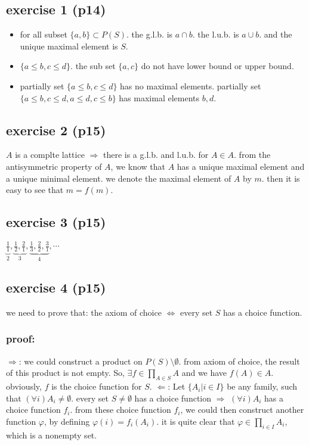 \documentclass[11pt]{article}
\begin{document}
\subsection{exercise 1 (p14)}
\label{sec:orgeb4f90c}
\begin{itemize}
\item for all subset \(\{a, b\}\subset P(S)\). the g.l.b. is \(a\cap b\).
the l.u.b. is \(a\cup b\). and the unique maximal element is \(S\).
\item \(\{a\leq b, c\leq d\}\). 
the sub set \(\{a, c\}\) do not have lower bound or upper bound.
\item partially set \(\{a\leq b, c\leq d\}\) has no maximal elements.
partially set \(\{a\leq b, c\leq d, a\leq d, c\leq b\}\) has maximal elements \(b, d\).
\end{itemize}
\subsection{exercise 2 (p15)}
\label{sec:org5f3d288}
\(A\) is a complte lattice \(\Rightarrow\) there is a g.l.b. and l.u.b. for \(A\in A\).
from the antisymmetric property of \(A\), we know that \(A\) has 
a unique maximal element and a unique minimal element.
we denote the maximal element of \(A\) by \(m\).
then it is easy to see that \(m = f(m)\).
\subsection{exercise 3 (p15)}
\label{sec:org4d8c99f}
\(\underbrace{\frac{1}{1}}_{2}, \underbrace{\frac{1}{2}, \frac{2}{1}}_{3}, \underbrace{\frac{1}{3}, \frac{2}{2}, \frac{3}{1}}_{4}, \cdots\)
\subsection{exercise 4 (p15)}
\label{sec:org3c1d98b}
we need to prove that:
       the axiom of choice \(\iff\) every set \(S\) has a choice function.
\subsubsection{proof:}
\label{sec:orgb031305}
\(\Rightarrow\): we could construct a product on \(P(S)\setminus \emptyset\).
from axiom of choice, the result of this product is not empty.
So, \(\exists f \in \prod_{A\in S} A\) and we have \(f(A)\in A\).
obviously, \(f\) is the choice function for \(S\).
\(\Leftarrow\): Let \(\{A_i|i\in I\}\) be any family, such that \((\forall i) A_i \not= \emptyset\).
every set \(S\not=\emptyset\) has a choice function \(\Rightarrow\) \((\forall i) A_i\) has a choice function \(f_i\).
from these choice function \(f_i\), we could then construct another function \(\varphi\), 
by defining \(\varphi(i) = f_i(A_i)\). it is quite clear that \(\varphi \in \prod_{i\in I} A_i\), 
which is a nonempty set.
\end{document}
